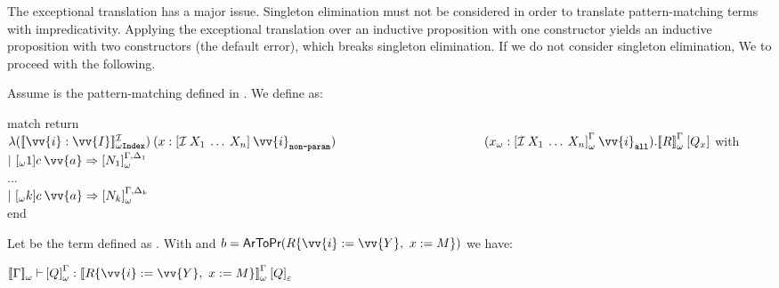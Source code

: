 The exceptional translation has a major issue. Singleton elimination must not be considered in order to 
translate pattern-matching terms with impredicativity. Applying the exceptional
translation over an inductive proposition with one constructor yields an inductive proposition with two 
constructors (the default error), which breaks singleton elimination. If we do not consider singleton elimination,
We to proceed with the following.
\newcommand{\WIndexIndTrans}[2][\IndD]{\TypeTrans{#2}_{\WTransSymbol\mathtexttt{Index}}^{#1}}
\begin{Definition}
\label{def:WParamTransPM}
Assume \MatchTerm{} is the pattern-matching defined in . We define \WParamTrans{\MatchTerm{}}
as:
\begin{adjustwidth}{1.5em}{0cm} \normalfont \sffamily
match \WParamTrans{\M{}} return $\lambda\app{(\WIndexIndTrans{\vv{i}:\vv{I}})}{
                    (x: \app{\Trans{\app{\IndD}{X_1}{\dots}{X_n}}}{\vv{i}_{\mathtexttt{non-param}}})}{$\\
\hspace*{4cm}  $(\WTermTrans{x}: \app{\WParamTrans{\app{\IndD}{X_1}{\dots}{X_n}}}{\vv{i}_{\mathtexttt{all}}})}.
                    \app{\WParamTypeTrans[\Context]{R}}{\Trans{\MatchTerm_x}}$ with\\
$|\ \app{\WTermTrans[1]{c}}{\vv{a}} \Rightarrow \WParamTrans[\Context,\Delta_1]{N_1}$\\
$\dots$\\
$|\ \app{\WTermTrans[k]{c}}{\vv{a}} \Rightarrow \WParamTrans[\Context,\Delta_k]{N_k}$\\
end
\end{adjustwidth}
\end{Definition}

\begin{Theorem}
Let \MatchTerm{} be the term defined as . With  and 
$b\termEq\propFun[\subst{R}{\vv{i}}{\vv{Y}}{x}{M}]$ we have:
\begin{center}  
    $\ctyping[][\WContextTrans{\Context}]{\WParamTrans{\MatchTerm}}{
                        \app{\WParamTypeTrans{\subst{R}{\vv{i}}{\vv{Y}}{x}{M}}}{\ParamTrans{\MatchTerm}}}$
\end{center}
\end{Theorem}

